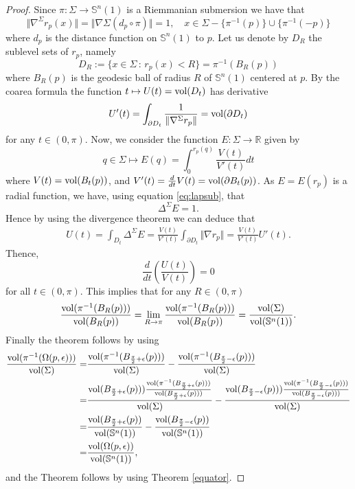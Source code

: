 \documentclass{amsart}
\theoremstyle{definition}
\theoremstyle{remark}
\newcommand{\ese}{\mathbb{S}}
\begin{document}
\begin{proof}
Since $\pi:\Sigma \rightarrow \ese^n(1)$ is a Riemmanian submersion we have that
$$
\Vert \nabla^\Sigma r_p(x)\Vert =\Vert \nabla\Sigma \left(d_p\circ \pi\right)\Vert=1, \quad x\in \Sigma-\{\pi^{-1}(p)\}\cup \{\pi^{-1}(-p) \}
$$
where  $d_p$ is the distance function on $\mathbb{S}^n(1)$ to $p$. 
Let us denote by $D_R$ the sublevel sets of $r_p$, namely
$$
D_R:=\{x\in \Sigma\, : \, r_p(x)<R\}=\pi^{-1}(B_R(p))
$$
where $B_R(p)$ is the geodesic ball of radius $R$ of $\mathbb{S}^n(1)$ centered at $p$. By the coarea formula the function $t\mapsto U(t)={\rm vol}(D_t)$ has derivative
$$
U'(t)=\int_{\partial D_t}\frac{1}{\Vert \nabla^\Sigma r_p\Vert}={\rm vol}(\partial D_t)
$$
for any $t\in (0,\pi)$. Now, we consider the function $E:\Sigma\to \mathbb{R}$ given by
$$
q\in \Sigma\mapsto E(q)=\int_0^{r_p(q)}\frac{V(t)}{V'(t)}dt
$$
where $V(t)={\rm vol}(B_t(p))$, and $V'(t)=\frac{d}{dt}V(t)={\rm vol }(\partial B_t(p))$. As  $E=E(r_p)$ is a radial function, we have, using equation \eqref{eq:lapsub}, that
$$
\Delta^{\Sigma}E=1.
$$
Hence by using the divergence theorem we can deduce that
$$
\begin{aligned}
    U(t)=\int_{D_t}\Delta^\Sigma E=\frac{V(t)}{V'(t)}\int_{\partial D_t}\Vert \nabla r_p\Vert=\frac{V(t)}{V'(t)}U'(t).
\end{aligned}
$$
Thence,
$$
\frac{d}{dt}\left(\frac{U(t)}{V(t)}\right)=0
$$
for all $t\in (0,\pi)$. This implies that for any $R\in(0,\pi)$
$$
\frac{{\rm vol}(\pi^{-1}(B_R(p)))}{{\rm vol}(B_R(p))}=\lim_{R\to \pi}\frac{{\rm vol}(\pi^{-1}(B_R(p)))}{{\rm vol}(B_R(p))}=\frac{{\rm vol}(\Sigma)}{{\rm vol}(\mathbb{S}^n(1))}.
$$
Finally the theorem follows by using
$$
\begin{aligned}
\frac{{\rm vol}(\pi^{-1}(\Omega(p,\epsilon)))}{{\rm vol}(\Sigma)}=&\frac{{\rm vol}(\pi^{-1}(B_{\frac{\pi}{2}+\epsilon}(p)))}{{\rm vol}(\Sigma)}-\frac{{\rm vol}(\pi^{-1}(B_{\frac{\pi}{2}-\epsilon}(p)))}{{\rm vol}(\Sigma)}  \\
=&\frac{{\rm vol}(B_{\frac{\pi}{2}+\epsilon}(p)))\frac{{\rm vol}(\pi^{-1}(B_{\frac{\pi}{2}+\epsilon}(p)))}{
{\rm vol}(B_{\frac{\pi}{2}+\epsilon}(p)))}}{{\rm vol}(\Sigma)}-\frac{{\rm vol}(B_{\frac{\pi}{2}-\epsilon}(p)))\frac{{\rm vol}(\pi^{-1}(B_{\frac{\pi}{2}-\epsilon}(p)))}{
{\rm vol}(B_{\frac{\pi}{2}-\epsilon}(p)))}}{{\rm vol}(\Sigma)}\\
=&\frac{{\rm vol}(B_{\frac{\pi}{2}+\epsilon}(p))}{{\rm vol}(\mathbb{S}^n(1))}-\frac{{\rm vol}(B_{\frac{\pi}{2}-\epsilon}(p))}{{\rm vol}(\mathbb{S}^n(1))}\\
=&\frac{{\rm vol}(\Omega(p,\epsilon))}{{\rm vol}(\mathbb{S}^n(1))},
\end{aligned}
$$
and the Theorem follows by using Theorem \ref{equator}.

\end{proof}
\end{document}
